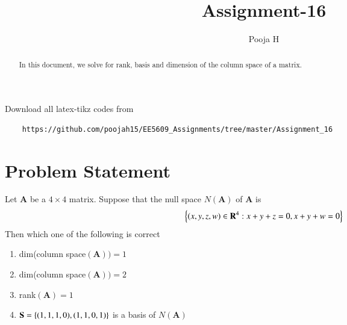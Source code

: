 \documentclass[journal,12pt,twocolumn]{IEEEtran}
\begin{document}
	\makeatother
	\let\StandardTheFigure\thefigure
	\let\vec\mathbf
	\renewcommand{\thefigure}{\theproblem}
	\def\putbox#1#2#3{\makebox[0in][l]{\makebox[#1][l]{}\raisebox{\baselineskip}[0in][0in]{\raisebox{#2}[0in][0in]{#3}}}}
	\def\rightbox#1{\makebox[0in][r]{#1}}
	\def\centbox#1{\makebox[0in]{#1}}
	\def\topbox#1{\raisebox{-\baselineskip}[0in][0in]{#1}}
	\def\midbox#1{\raisebox{-0.5\baselineskip}[0in][0in]{#1}}
	\vspace{3cm}
	\title{Assignment-16}
	\author{Pooja H}
	\maketitle
	\newpage
	\bigskip
	\renewcommand{\thefigure}{\theenumi}
	\renewcommand{\thetable}{\theenumi}
	\begin{abstract}
		In this document, we solve for rank, basis and dimension of the column space of a matrix.
	\end{abstract}
	Download all latex-tikz codes from 
\begin{lstlisting}
	https://github.com/poojah15/EE5609_Assignments/tree/master/Assignment_16
\end{lstlisting}
	\section{Problem Statement}
	Let $\vec{A}$ be a $4 \times 4$ matrix. Suppose that the null space $N(\vec{A})$ of $\vec{A}$ is
	\begin{align}
		\cbrak{(x,y,z,w) \in \vec{R}^4 : x + y + z = 0 , x + y + w = 0}
	\end{align}
Then which one of the following is correct
\begin{enumerate}
\item  dim(column space$(\vec{A})) = 1$ 
\item dim(column space$(\vec{A})) = 2$
\item rank$(\vec{A}) = 1$
\item $\vec{S}= \cbrak{(1, 1, 1, 0), (1, 1, 0, 1)}$ is a basis of $N(\vec{A})$
\end{enumerate}
\end{document}
